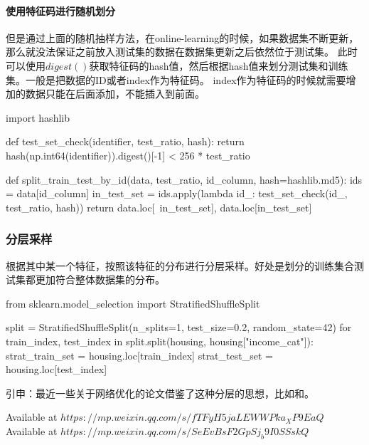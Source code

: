\documentclass[UTF8]{ctexart}
\begin{document}
\paragraph{使用特征码进行随机划分}
但是通过上面的随机抽样方法，在online-learning的时候，如果数据集不断更新，那么就没法保证之前放入测试集的数据在数据集更新之后依然位于测试集。
此时可以使用$digest()$获取特征码的hash值，然后根据hash值来划分测试集和训练集。一般是把数据的ID或者index作为特征码。
index作为特征码的时候就需要增加的数据只能在后面添加，不能插入到前面。
\begin{python}
    import hashlib

    def test_set_check(identifier, test_ratio, hash):
        return hash(np.int64(identifier)).digest()[-1] < 256 * test_ratio

    def split_train_test_by_id(data, test_ratio, id_column, hash=hashlib.md5):
        ids = data[id_column]
        in_test_set = ids.apply(lambda id_: test_set_check(id_, test_ratio, hash))
        return data.loc[~in_test_set], data.loc[in_test_set]
\end{python}


\paragraph{}

\subsubsection{分层采样}
根据其中某一个特征，按照该特征的分布进行分层采样。好处是划分的训练集合测试集都更加符合整体数据集的分布。
\begin{python}
    from sklearn.model_selection import StratifiedShuffleSplit
    
    split = StratifiedShuffleSplit(n_splits=1, test_size=0.2, random_state=42)
    for train_index, test_index in split.split(housing, housing["income_cat"]):
        strat_train_set = housing.loc[train_index]
        strat_test_set = housing.loc[test_index]
\end{python}
引申：最近一些关于网络优化的论文借鉴了这种分层的思想，比如\cite{lsltr}和\cite{libra_rcnn}。

\renewcommand\refname{参考文献}
\begin{thebibliography}{99}
     Available at $https://mp.weixin.qq.com/s/fTFyH5jaLEWWPka_XP9EaQ$
      Available at $https://mp.weixin.qq.com/s/SeEvBsF2GpSj_b9I0SSskQ$
\end{thebibliography}


\ifx\allfiles\undefined
\end{document}
